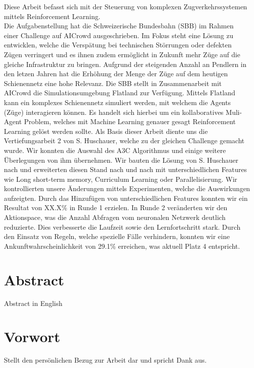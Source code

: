 Diese Arbeit befasst sich mit der Steuerung von komplexen Zugverkehrssystemen mittels Reinforcement Learning.\\
Die Aufgabenstellung hat die Schweizerische Bundesbahn (SBB) im Rahmen einer Challenge auf AICrowd ausgeschrieben.
Im Fokus steht eine Lösung zu entwicklen, welche die Verspätung bei technischen Störrungen oder defekten Zügen verringert und es ihnen zudem ermöglicht in Zukunft mehr Züge auf die gleiche Infrastruktur zu bringen.
Aufgrund der steigenden Anzahl an Pendlern in den letzen Jahren hat die Erhöhung der Menge der Züge auf dem heutigen Schienennetz eine hohe Relevanz.
Die SBB stellt in Zusammenarbeit mit AICrowd die Simulationsumgebung Flatland zur Verfügung. Mittels Flatland kann ein komplexes Schienennetz simuliert werden, mit welchem die Agents (Züge) interagieren können.
Es handelt sich hierbei um ein kollaboratives Muli-Agent Problem, welches mit Machine Learning genauer gesagt Reinforcement Learning gelöst werden sollte.
Als Basis dieser Arbeit diente uns die Vertiefungsarbeit 2 von S. Huschauer, welche zu der gleichen Challenge gemacht wurde.
Wir konnten die Auswahl des A3C Algorithmus und einige weitere Überlegungen von ihm übernehmen.
Wir bauten die Lösung von S. Huschauer nach und erweiterten diesen Stand nach und nach mit unterschiedlichen Features wie Long short-term memory, Curriculum Learning oder Parallelisierung.
Wir kontrollierten unsere Änderungen mittels Experimenten, welche die Auswirkungen aufzeigten.
Durch das Hinzufügen von unterschiedlichen Features konnten wir ein Resultat von XX.X\% in Runde 1 erzielen.
In Runde 2 veränderten wir den Aktionspace, was die Anzahl Abfragen vom neuronalen Netzwerk deutlich reduzierte. Dies verbesserte die Laufzeit sowie den Lernfortschritt stark.
Durch den Einsatz von Regeln, welche spezielle Fälle verhindern, konnten wir eine Ankunftwahrscheinlichkeit von 29.1\% erreichen, was aktuell Platz 4 entspricht.

\newpage
\thispagestyle{empty}
\chapter*{Abstract}\label{abstract}
Abstract in English


\chapter*{Vorwort}\label{vorwort}
Stellt den persönlichen Bezug zur Arbeit dar und spricht Dank aus.